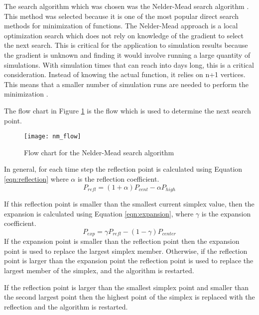 \label{algrothim_description}

The search algorithm which was chosen was the Nelder-Mead search algorithm \cite{nelder_1965}.  This method was selected because it is one of the most popular direct search methods for minimization of functions.  The Nelder-Mead approach is a local optimization search which does not rely on knowledge of the gradient to select the next search.  This is critical for the application to simulation results because the gradient is unknown and finding it would involve running a large quantity of simulations.  With simulation times that can reach into days long, this is a critical consideration.  
Instead of knowing the actual function, it relies on n+1 vertices.  This means that a smaller number of simulation runs are needed to perform the minimization \cite{wang_2011}.

The flow chart in Figure \ref{fig:nm_flow} is the flow which is used to determine the next search point.
\begin{figure}[!htb]
	\centering
	\texttt{[image: nm\_flow]}
	\caption{Flow chart for the Nelder-Mead search algorithm\cite{nelder_1965}}
	\label{fig:nm_flow}
\end{figure}

In general, for each time step the reflection point is calculated using Equation \ref{eqn:reflection} where $\alpha$ is the reflection coefficient.
	\begin{equation}\label{eqn:reflection}
		P_{refl} = (1 + \alpha) P_{cent} - \alpha P_{high}
	\end{equation}

If this reflection point is smaller than the smallest current simplex value, then the expansion is calculated using Equation \ref{eqn:expansion}, where $\gamma$ is the expansion coefficient.
	\begin{equation}\label{eqn:expansion}
		P_{exp} = \gamma P_{refl} - (1 - \gamma) P_{center}
	\end{equation}
If the expansion point is smaller than the reflection point then the expansion point is used to replace the largest simplex member.  Otherwise, if the reflection point is larger than the expansion point the reflection point is used to replace the largest member of the simplex, and the algorithm is restarted.

If the reflection point is larger than the smallest simplex point and smaller than the second largest point then the highest point of the simplex is replaced with the reflection and the algorithm is restarted. 

